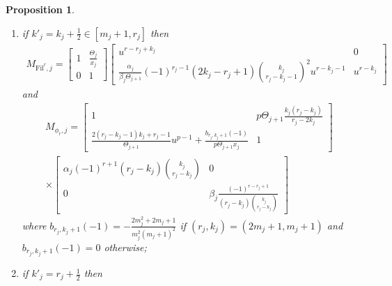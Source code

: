 \documentclass[11pt]{amsart}
\theoremstyle{definition}
\numberwithin{equation}{subsection}
\theoremstyle{plain}
\theoremstyle{plain}
\theoremstyle{plain}
\theoremstyle{plain}
\theoremstyle{plain}
\theoremstyle{plain}
\theoremstyle{plain}
\theoremstyle{plain}
\newtheorem{prop}[equation]{Proposition}
\theoremstyle{plain}
\theoremstyle{plain}
\theoremstyle{plain}
\theoremstyle{plain}
\theoremstyle{definition}
\theoremstyle{definition}
\theoremstyle{definition}
\theoremstyle{remark}
\renewcommand{\(}{\textup{(}}
\renewcommand{\)}{\textup{)}}
\newcommand{\Fil}{\mathrm{Fil}}
\begin{document}
\begin{prop}
\begin{enumerate}[leftmargin=*]
\begin{align*}
    \end{align*}
    and
    \begin{align*}
    M_{\phi_r,j}
        =
        \begin{bmatrix}
            1 & p\Theta_{j+1}m_j(m_j+1) \\
            \frac{2m_j(m_j+1)}{\Theta_{j+1}}u^{p-1} & 1
        \end{bmatrix}
        \begin{bmatrix}
            \alpha_j (-1)^{r+1} & 0 \\
            0 & \beta_j (-1)^r
        \end{bmatrix};
    \end{align*}
\item if $k'_j=k_j+\frac{1}{2}\in [m_j+1,r_j]$ then
    \begin{align*}
    M_{\Fil^r,j}
        =
        \begin{bmatrix}
            1 & \frac{\Theta_j}{x_j} \\
            0 & 1
        \end{bmatrix}
        \begin{bmatrix}
            u^{r-r_j+k_j} & 0 \\
            \frac{\alpha_j}{\beta_j\Theta_{j+1}}(-1)^{r_j-1}(2k_j-r_j+1)\binom{k_j}{r_j-k_j-1}^2 u^{r-k_j-1} & u^{r-k_j}
        \end{bmatrix}
    \end{align*}
    and
    \begin{multline*}
    M_{\phi_r,j}
        =
        \begin{bmatrix}
            1 & p\Theta_{j+1}\frac{k_j(r_j-k_j)}{r_j-2k_j} \\
            \frac{2(r_j-k_j-1)k_j+r_j-1}{\Theta_{j+1}}u^{p-1} +\frac{b_{r_j,k_j+1}(-1)}{p\Theta_{j+1}x_j} & 1
        \end{bmatrix}\\
        \times
        \begin{bmatrix}
            \alpha_j (-1)^{r+1}(r_j-k_j)\binom{k_j}{r_j-k_j} & 0 \\
            0 & \beta_j \frac{(-1)^{r-r_j+1}}{(r_j-k_j)\binom{k_j}{r_j-k_j}}
        \end{bmatrix}
    \end{multline*}
    where $b_{r_j,k_j+1}(-1)=-\frac{2m_j^2+2m_j+1}{m_j^2(m_j+1)^2}$ if $(r_j,k_j)=(2m_j+1,m_j+1)$ and $b_{r_j,k_j+1}(-1)=0$ otherwise;
 \item if $k'_j=r_j+\frac{1}{2}$ then
    \begin{align*}

\end{align*}
\end{enumerate}
\end{prop}
\end{document}
